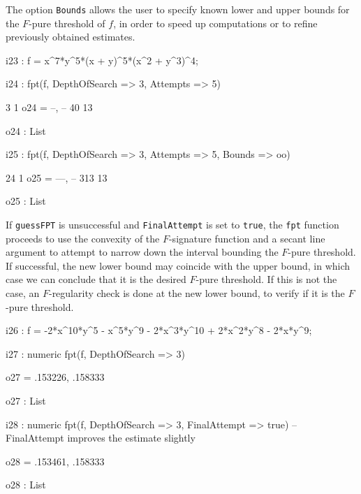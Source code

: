 \documentclass{amsart}
\begin{document}
The option {\tt Bounds} allows the user to specify known lower and upper bounds for the $F$-pure threshold of $f$, in order to speed up computations or to refine previously obtained estimates.

\medspace
{\small
{}
\begin{MyVerbatim}

i23 : f = x^7*y^5*(x + y)^5*(x^2 + y^3)^4;

i24 : fpt(f, DepthOfSearch => 3, Attempts => 5)


        3   1
o24 = {--, --}
       40  13

o24 : List

i25 : fpt(f, DepthOfSearch => 3, Attempts => 5, Bounds => oo)

        24   1
o25 = {---, --}
       313  13

o25 : List
\end{MyVerbatim}
}
\medspace


If {\tt guessFPT} is unsuccessful and {\tt FinalAttempt} is set to {\tt true}, the {\tt fpt} function proceeds to use the convexity of the $F$-signature function and a secant line argument to attempt to narrow down the interval bounding the $F$-pure threshold.
If successful, the new lower bound may coincide with the upper bound, in which case we can conclude that it is the desired $F$-pure threshold.
If this is not the case, an $F$-regularity check is done at the new lower bound, to verify if it is the $F$-pure threshold.

\medspace
{\small
{}
\begin{MyVerbatim}

i26 : f = -2*x^10*y^5 - x^5*y^9 - 2*x^3*y^10 + 2*x^2*y^8 - 2*x*y^9;

i27 : numeric fpt(f, DepthOfSearch => 3)

o27 = {.153226, .158333}

o27 : List

i28 : numeric fpt(f, DepthOfSearch => 3, FinalAttempt => true)
      -- FinalAttempt improves the estimate slightly

o28 = {.153461, .158333}

o28 : List
\end{MyVerbatim}
}
\medspace

\end{document}

